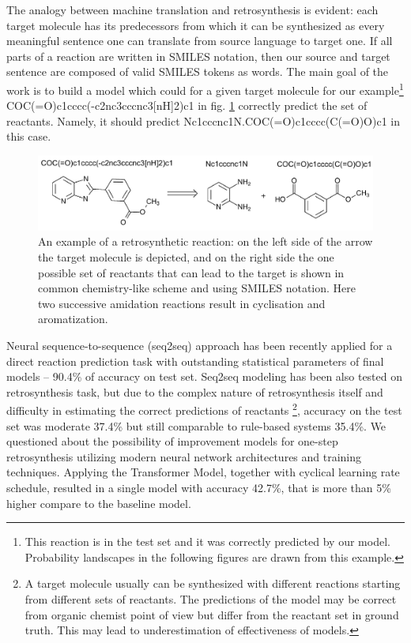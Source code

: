 \documentclass{article}
\begin{document}
The analogy between machine translation and retrosynthesis is evident: each target molecule has 
its predecessors from which it can be synthesized as every meaningful sentence one can translate 
from source language to target one. If all parts of a reaction are written in SMILES notation, 
then our source and target sentence are composed of valid SMILES tokens as words. 
The main goal of the work is to build a model which could for a given target molecule for our example\footnote{
This reaction is in the test set and it was correctly predicted  by our model. 
Probability landscapes in the following figures are drawn from this example.} COC(=O)c1cccc(-c2nc3cccnc3[nH]2)c1 in fig. \ref{fig:example-reaction}
correctly predict the set of reactants. Namely, it should predict Nc1cccnc1N.COC(=O)c1cccc(C(=O)O)c1 in this case.

\begin{figure}
  \centering
  \includegraphics[scale=0.87]{images/example-reaction.pdf}
  \caption{An example of a retrosynthetic reaction: on the left side of the arrow the target molecule is depicted, and on the right side the one possible set of reactants that can lead to the target is shown in common chemistry-like scheme and using SMILES notation. Here two successive amidation reactions result in cyclisation and aromatization.}
  \label{fig:example-reaction}
\end{figure}

Neural sequence-to-sequence (seq2seq) approach has been recently applied for a direct reaction 
prediction task \cite{SchwallerTranslation,SchwallerTransformer} with outstanding statistical 
parameters of final models -- 90.4\% of accuracy on test set. Seq2seq modeling has been also tested on 
retrosynthesis task\cite{Pande}, but due to the complex nature of retrosynthesis itself 
and difficulty in estimating the correct predictions of reactants
\footnote{A target molecule usually can be synthesized with different reactions starting from different sets of reactants. 
The predictions of the model may be correct from organic chemist point of view but differ from 
the reactant set in ground truth. This may lead to underestimation of effectiveness of models.}, 
accuracy on the test set was moderate 37.4\% but still comparable to rule-based systems 35.4\%. 
We questioned about the possibility of improvement models for one-step retrosynthesis utilizing modern neural network architectures 
and training techniques. Applying the Transformer Model\cite{Transformer}, 
together with cyclical learning rate schedule\cite{TransformerTips}, 
resulted in a single model with accuracy 42.7\%, 
that is more than 5\% higher compare to the baseline model\cite{Pande}.  
\end{document}
